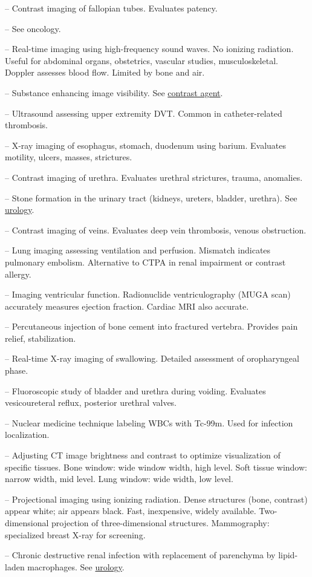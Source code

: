-- Contrast imaging of fallopian tubes. Evaluates patency.

-- See oncology.

-- Real-time imaging using high-frequency sound waves. No ionizing radiation. Useful for abdominal organs, obstetrics, vascular studies, musculoskeletal. Doppler assesses blood flow. Limited by bone and air.

-- Substance enhancing image visibility. See \hyperlink{Contrast Agent}{contrast agent}.

-- Ultrasound assessing upper extremity DVT. Common in catheter-related thrombosis.

-- X-ray imaging of esophagus, stomach, duodenum using barium. Evaluates motility, ulcers, masses, strictures.

-- Contrast imaging of urethra. Evaluates urethral strictures, trauma, anomalies.

-- Stone formation in the urinary tract (kidneys, ureters, bladder, urethra). See \hyperlink{Urology}{urology}.

-- Contrast imaging of veins. Evaluates deep vein thrombosis, venous obstruction.

-- Lung imaging assessing ventilation and perfusion. Mismatch indicates pulmonary embolism. Alternative to CTPA in renal impairment or contrast allergy.

-- Imaging ventricular function. Radionuclide ventriculography (MUGA scan) accurately measures ejection fraction. Cardiac MRI also accurate.

-- Percutaneous injection of bone cement into fractured vertebra. Provides pain relief, stabilization.

-- Real-time X-ray imaging of swallowing. Detailed assessment of oropharyngeal phase.

-- Fluoroscopic study of bladder and urethra during voiding. Evaluates vesicoureteral reflux, posterior urethral valves.

-- Nuclear medicine technique labeling WBCs with Tc-99m. Used for infection localization.

-- Adjusting CT image brightness and contrast to optimize visualization of specific tissues. Bone window: wide window width, high level. Soft tissue window: narrow width, mid level. Lung window: wide width, low level.

-- Projectional imaging using ionizing radiation. Dense structures (bone, contrast) appear white; air appears black. Fast, inexpensive, widely available. Two-dimensional projection of three-dimensional structures. Mammography: specialized breast X-ray for screening.

-- Chronic destructive renal infection with replacement of parenchyma by lipid-laden macrophages. See \hyperlink{Urology}{urology}.
